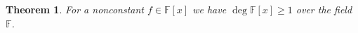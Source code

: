 \documentclass{article}
\newtheorem{theorem}{Theorem}
\newcommand{\field}{\mathbb{F}}
\newcommand{\poly}[1]{\field[#1]}
\def\deg{\operatorname{deg}}
\newcommand{\degpoly}[1]{\deg \poly{#1}}
\begin{document}
\begin{theorem}\label{thm:macros}
For a nonconstant $f \in \poly{x}$ we have $\degpoly{x} \geq 1$ over the field $\field$.
\end{theorem}
\end{document}
